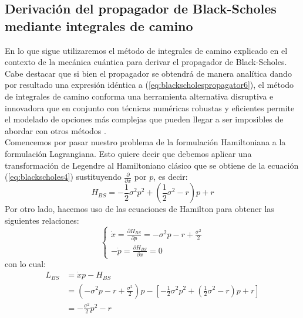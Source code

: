 \documentclass[11pt,a4paper]{article}
\begin{document}
\subsection{Derivaci\'on del propagador de Black-Scholes mediante integrales de camino}
En lo que sigue utilizaremos el m\'etodo de integrales de camino explicado en el contexto de la mec\'anica cu\'antica para derivar el propagador de Black-Scholes. Cabe destacar que si bien el propagador se obtendr\'a de manera anal\'itica dando por resultado una expresi\'on id\'entica a (\ref{eq:blackscholespropagator6}), el m\'etodo de integrales de camino conforma una herramienta alternativa disruptiva e innovadora que en conjunto con t\'ecnicas num\'ericas robustas y eficientes permite el modelado de opciones m\'as complejas que pueden llegar a ser imposibles de abordar con otros m\'etodos \cite{linetsky1997path, devreese2010path, montagna2002path, capuozzo2021path, ziemann2021quantum, baaquie2007quantum, baaquie2020mathematical}.\\
Comencemos por pasar nuestro problema de la formulaci\'on Hamiltoniana a la formulaci\'on Lagrangiana. Esto quiere decir que debemos aplicar una transformaci\'on de Legendre al Hamiltoniano cl\'asico que se obtiene de la ecuaci\'on (\ref{eq:blackscholes4}) sustituyendo $\frac{\partial}{\partial x}$ por $p$, es decir:
\begin{equation}
H_{BS} = - \frac{1}{2} \sigma^2 p^2 + \left( \frac{1}{2} \sigma^2 - r \right)p+ r
\label{eq:blackscholes5}
\end{equation}
Por otro lado, hacemos uso de las ecuaciones de Hamilton para obtener las siguientes relaciones:
\begin{equation}
\left\{
\begin{array}{l}
\dot{x} = \frac{\partial H_{BS}}{\partial p} = -\sigma^2 p - r +\frac{\sigma^2}{2} \\
-\dot{p} = \frac{\partial H_{BS}}{\partial x} = 0
\end{array}
\right.
\label{eq:hamiltonequations}
\end{equation}
con lo cual:
\begin{equation}
\begin{split}
L_{BS} & = \dot{x}p - H_{BS} \\
& = \left( -\sigma^2 p - r +\frac{\sigma^2}{2} \right)p - \left[ - \frac{1}{2} \sigma^2 p^2 + \left( \frac{1}{2} \sigma^2 - r \right)p+ r \right] \\
& = -\frac{\sigma^2}{2}p^2 - r
\end{split}
\label{eq:blackscholeslagrangian1}
\end{equation}
\end{document}
